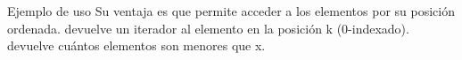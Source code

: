 {}Ejemplo de uso\markdownRendererInterblockSeparator
{}\markdownRendererInterblockSeparator
{}Su ventaja es que permite acceder a los elementos por su posición ordenada.\markdownRendererInterblockSeparator
{}\markdownRendererUlBeginTight
\markdownRendererUlItem {} devuelve un iterador al elemento en la posición k (0-indexado).\markdownRendererUlItemEnd 
\markdownRendererUlItem {} devuelve cuántos elementos son menores que x.\markdownRendererUlItemEnd 
\markdownRendererUlEndTight \markdownRendererInterblockSeparator
{}
\markdownRendererSectionEnd 
\markdownRendererSectionEnd 
\markdownRendererSectionEnd \markdownRendererDocumentEnd